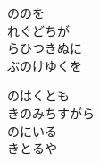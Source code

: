 \documentclass[10pt,b5j]{tarticle} %
\begin{document}
\begin{enumerate}
\begin{minipage}[c]{\blocksize}
        \vspace{\linespace}
        \item
        ののを\\
        れぐどちが\\
        らひつきぬに\\
        ぶのけゆくを
        
        \vspace{\linespace}
        \item
        のはくとも\\
        きのみちすがら\\
        のにいる\\
        きとるや
    
    \end{minipage}
\end{enumerate} %
\end{document}
